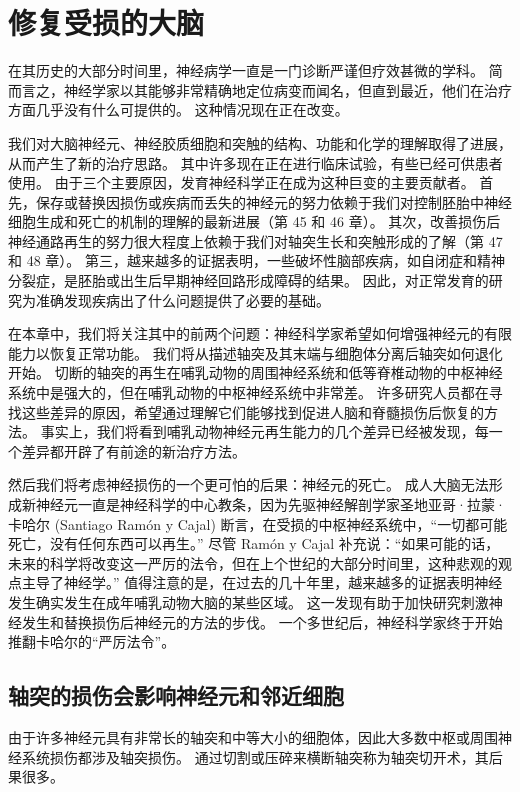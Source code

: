 \chapter{修复受损的大脑}

在其历史的大部分时间里，神经病学一直是一门诊断严谨但疗效甚微的学科。 简而言之，神经学家以其能够非常精确地定位病变而闻名，但直到最近，他们在治疗方面几乎没有什么可提供的。 这种情况现在正在改变。

我们对大脑神经元、神经胶质细胞和突触的结构、功能和化学的理解取得了进展，从而产生了新的治疗思路。 其中许多现在正在进行临床试验，有些已经可供患者使用。 由于三个主要原因，发育神经科学正在成为这种巨变的主要贡献者。 首先，保存或替换因损伤或疾病而丢失的神经元的努力依赖于我们对控制胚胎中神经细胞生成和死亡的机制的理解的最新进展（第 45 和 46 章）。 其次，改善损伤后神经通路再生的努力很大程度上依赖于我们对轴突生长和突触形成的了解（第 47 和 48 章）。 第三，越来越多的证据表明，一些破坏性脑部疾病，如自闭症和精神分裂症，是胚胎或出生后早期神经回路形成障碍的结果。 因此，对正常发育的研究为准确发现疾病出了什么问题提供了必要的基础。

在本章中，我们将关注其中的前两个问题：神经科学家希望如何增强神经元的有限能力以恢复正常功能。 我们将从描述轴突及其末端与细胞体分离后轴突如何退化开始。 切断的轴突的再生在哺乳动物的周围神经系统和低等脊椎动物的中枢神经系统中是强大的，但在哺乳动物的中枢神经系统中非常差。 许多研究人员都在寻找这些差异的原因，希望通过理解它们能够找到促进人脑和脊髓损伤后恢复的方法。 事实上，我们将看到哺乳动物神经元再生能力的几个差异已经被发现，每一个差异都开辟了有前途的新治疗方法。

然后我们将考虑神经损伤的一个更可怕的后果：神经元的死亡。 成人大脑无法形成新神经元一直是神经科学的中心教条，因为先驱神经解剖学家圣地亚哥·拉蒙·卡哈尔 (Santiago Ramón y Cajal) 断言，在受损的中枢神经系统中，“一切都可能死亡，没有任何东西可以再生。” 尽管 Ramón y Cajal 补充说：“如果可能的话，未来的科学将改变这一严厉的法令，但在上个世纪的大部分时间里，这种悲观的观点主导了神经学。” 值得注意的是，在过去的几十年里，越来越多的证据表明神经发生确实发生在成年哺乳动物大脑的某些区域。 这一发现有助于加快研究刺激神经发生和替换损伤后神经元的方法的步伐。 一个多世纪后，神经科学家终于开始推翻卡哈尔的“严厉法令”。


\section{轴突的损伤会影响神经元和邻近细胞}
由于许多神经元具有非常长的轴突和中等大小的细胞体，因此大多数中枢或周围神经系统损伤都涉及轴突损伤。 通过切割或压碎来横断轴突称为轴突切开术，其后果很多。



